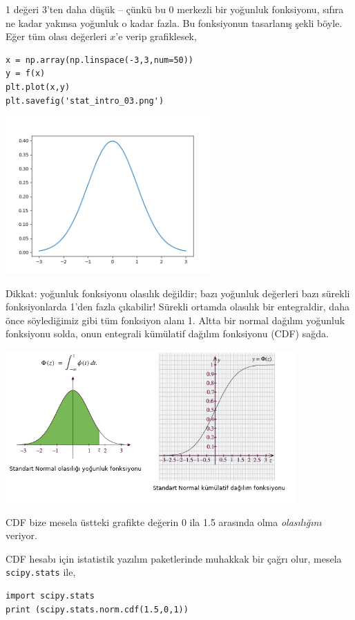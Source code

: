 \documentclass[12pt,fleqn]{article}\usepackage{../../common}
\begin{document}
1 değeri 3'ten daha düşük -- çünkü bu 0 merkezli bir yoğunluk fonksiyonu, sıfıra
ne kadar yakınsa yoğunluk o kadar fazla. Bu fonksiyonun tasarlanış şekli
böyle. Eğer tüm olası değerleri $x$'e verip grafiklesek,

\begin{verbatim}
x = np.array(np.linspace(-3,3,num=50))
y = f(x)
plt.plot(x,y)
plt.savefig('stat_intro_03.png')
\end{verbatim}

\includegraphics[height=6cm]{stat_intro_03.png}

Dikkat: yoğunluk fonksiyonu olasılık değildir; bazı yoğunluk değerleri bazı
sürekli fonksiyonlarda 1'den fazla çıkabilir! Sürekli ortamda olasılık bir
entegraldir, daha önce söylediğimiz gibi tüm fonksiyon alanı 1. Altta bir normal
dağılım yoğunluk fonksiyonu solda, onun entegrali kümülatif dağılım fonksiyonu
(CDF) sağda.

\includegraphics[width=30em]{stat_intro_11.png}

CDF bize mesela üstteki grafikte değerin 0 ila 1.5 arasında olma {\em olasılığını}
veriyor.

CDF hesabı için istatistik yazılım paketlerinde muhakkak bir çağrı olur, mesela
\verb!scipy.stats! ile,

\begin{verbatim}
import scipy.stats
print (scipy.stats.norm.cdf(1.5,0,1))
\end{verbatim}
\end{document}
